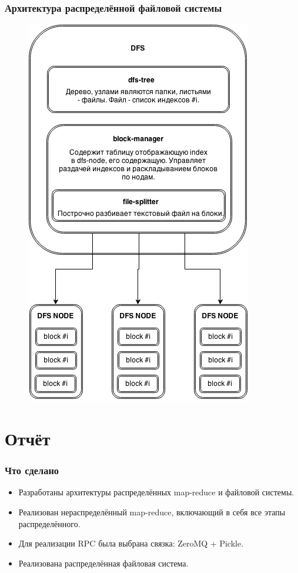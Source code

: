 \documentclass{beamer}
\begin{document}
    \begin{frame}
    \frametitle{Архитектура распределённой файловой системы}
        \begin{figure}[h!]
            \includegraphics[scale=0.3]{dfs.png}
        \end{figure}
    \end{frame}

\section{Отчёт}
    \begin{frame}
    \frametitle{Что сделано}
        \begin{itemize}
            \item Разработаны архитектуры распределённых map-reduce и файловой системы.
            \item Реализован нераспределённый map-reduce, включающий в себя все этапы распределённого.
            \item Для реализации RPC была выбрана связка: ZeroMQ + Pickle.
            \item Реализована распределённая файловая система.
        \end{itemize} 
    \end{frame}
\end{document}
